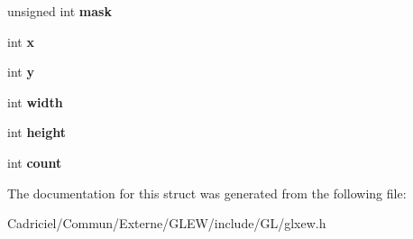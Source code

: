 \begin{DoxyCompactItemize}
\item 
unsigned int {\bfseries mask}\hypertarget{struct_g_l_x_buffer_clobber_event_s_g_i_x_a74b4ad1ad3cac011001151411f621da1}{}\label{struct_g_l_x_buffer_clobber_event_s_g_i_x_a74b4ad1ad3cac011001151411f621da1}

\item 
int {\bfseries x}\hypertarget{struct_g_l_x_buffer_clobber_event_s_g_i_x_a5118d48c3c8d5253d39922b5014b52ff}{}\label{struct_g_l_x_buffer_clobber_event_s_g_i_x_a5118d48c3c8d5253d39922b5014b52ff}

\item 
int {\bfseries y}\hypertarget{struct_g_l_x_buffer_clobber_event_s_g_i_x_aef21efa11558a5b67861f96471c56003}{}\label{struct_g_l_x_buffer_clobber_event_s_g_i_x_aef21efa11558a5b67861f96471c56003}

\item 
int {\bfseries width}\hypertarget{struct_g_l_x_buffer_clobber_event_s_g_i_x_adad23535733161528427584a42bfc6eb}{}\label{struct_g_l_x_buffer_clobber_event_s_g_i_x_adad23535733161528427584a42bfc6eb}

\item 
int {\bfseries height}\hypertarget{struct_g_l_x_buffer_clobber_event_s_g_i_x_a7838dbabb76c22aa8241310a3f2363ea}{}\label{struct_g_l_x_buffer_clobber_event_s_g_i_x_a7838dbabb76c22aa8241310a3f2363ea}

\item 
int {\bfseries count}\hypertarget{struct_g_l_x_buffer_clobber_event_s_g_i_x_ad8f4f0aae058e0a1ff542679823e37a9}{}\label{struct_g_l_x_buffer_clobber_event_s_g_i_x_ad8f4f0aae058e0a1ff542679823e37a9}

\end{DoxyCompactItemize}


The documentation for this struct was generated from the following file\+:\begin{DoxyCompactItemize}
\item 
Cadriciel/\+Commun/\+Externe/\+G\+L\+E\+W/include/\+G\+L/glxew.\+h\end{DoxyCompactItemize}
